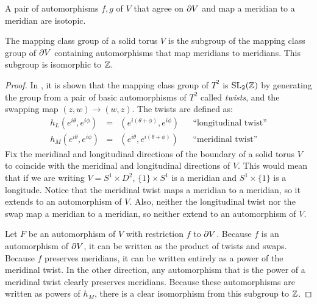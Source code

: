 \begin{lem}
	A pair of automorphisms $f,g$ of $V$ that agree on $\partial V$ and map a meridian to a meridian are isotopic.	
\end{lem}

\begin{theorem}
	The mapping class group of a solid torus $V$ is the subgroup of the mapping class group of $\partial V$ containing automorphisms that map meridians to meridians.
	This subgroup is isomorphic to $\mathbb{Z}$.	
\end{theorem}

\begin{proof}
	In \cite{Rolf76}, it is shown that the mapping class group of $T^2$ is $\textrm{SL}_2(\mathbb{Z})$ by generating the group from a pair of basic automorphisms of $T^2$ called \emph{twists}, and the swapping map $(z,w)\to(w,z)$.
	The twists are defined as:
	\[
	\begin{array}{ccccc}
	h_L(e^{i\theta},e^{i\phi}) & = & (e^{i(\theta+\phi)},e^{i\phi}) & & \textrm{``longitudinal twist''} \\
	
	h_M(e^{i\theta},e^{i\phi}) & = & (e^{i\theta},e^{i(\theta+\phi)}) & & \textrm{``meridinal twist''}	
	\end{array}
	\]
	Fix the meridinal and longitudinal directions of the boundary of a solid torus $V$ to coincide with the meridinal and longitudinal directions of $V$.
	This would mean that if we are writing $V=S^1\times D^2$, $\{1\}\times S^1$ is a meridian and $S^1\times\{1\}$ is a longitude.
	Notice that the meridinal twist maps a meridian to a meridian, so it extends to an automorphism of $V$.
	Also, neither the longitudinal twist nor the swap map a meridian to a meridian, so neither extend to an automorphism of $V$.
	
	Let $F$ be an automorphism of $V$ with restriction $f$ to $\partial V$.
	Because $f$ is an automorphism of $\partial V$, it can be written as the product of twists and swaps.
	Because $f$ preserves meridians, it can be written entirely as a power of the meridinal twist.
	In the other direction, any automorphism that is the power of a meridinal twist clearly preserves meridians.
	Because these automorphisms are written as powers of $h_M$, there is a clear isomorphism from this subgroup to $\mathbb{Z}$.
\end{proof}

